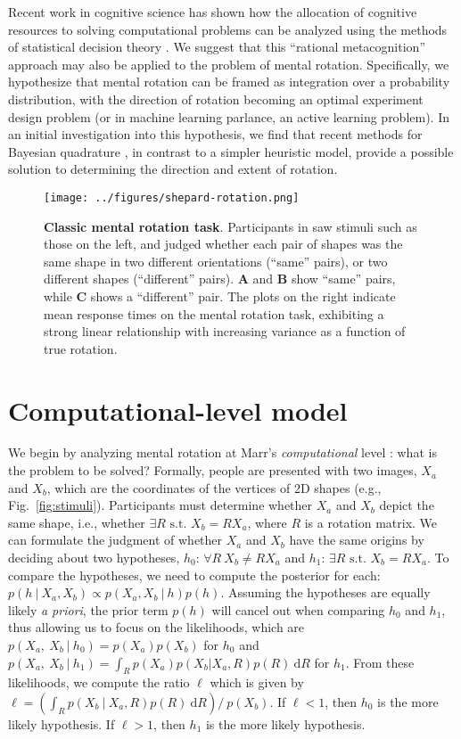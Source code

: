 \documentclass{article} %
\begin{document}
Recent work in cognitive science has shown how the allocation of
cognitive resources to solving computational problems can be analyzed
using the methods of statistical decision theory
\cite{Lieder:2012wg,Vul:2009wy}. We suggest that this ``rational
metacognition'' approach may also be applied to the problem of mental
rotation. Specifically, we hypothesize that mental rotation can be
framed as integration over a probability distribution, with the
direction of rotation becoming an optimal experiment design problem
(or in machine learning parlance, an active learning problem). In an
initial investigation into this hypothesis, we find that recent
methods for Bayesian quadrature
\cite{Diaconis:1988uo,OHagan:1991tx,Osborne:2012tm}, in contrast to a
simpler heuristic model, provide a possible solution to determining
the direction and extent of rotation.

\begin{figure}[t]
  \centering
  \texttt{[image: ../figures/shepard-rotation.png]}
  \caption{\textbf{Classic mental rotation task}. Participants in
    \cite{Shepard1971} saw stimuli such as those on the left, and
    judged whether each pair of shapes was the same shape in two
    different orientations (``same'' pairs), or two different shapes
    (``different'' pairs). \textbf{A} and \textbf{B} show ``same''
    pairs, while \textbf{C} shows a ``different'' pair. The plots on
    the right indicate mean response times on the mental rotation
    task, exhibiting a strong linear relationship with increasing
    variance as a function of true rotation.}
  \label{fig:mental-rotation}
\end{figure}

\section{Computational-level model}

We begin by analyzing mental rotation at Marr's \textit{computational}
level \cite{Marr:1983to}: what is the problem to be solved?  Formally,
people are presented with two images, $X_a$ and $X_b$, which are the
coordinates of the vertices of 2D shapes (e.g.,
Fig.~\ref{fig:stimuli}). Participants must determine whether $X_a$ and
$X_b$ depict the same shape, i.e., whether $\exists R\textrm{ s.t. }
X_b=RX_a$, where $R$ is a rotation matrix. We can formulate the
judgment of whether $X_a$ and $X_b$ have the same origins by deciding
about two hypotheses, $h_0$: $\forall R\ X_b\neq RX_a$ and $h_1$:
$\exists R\textrm{ s.t. } X_b=RX_a$.  To compare the hypotheses, we
need to compute the posterior for each: $p(h\ \vert\ X_a, X_b)\propto
p(X_a, X_b\ \vert\ h)p(h)$. Assuming the hypotheses are equally likely
\textit{a priori}, the prior term $p(h)$ will cancel out when
comparing $h_0$ and $h_1$, thus allowing us to focus on the
likelihoods, which are $p(X_a,\ X_b\ \vert \ h_0)=p(X_a)p(X_b)$ for
$h_0$ and $p(X_a,\ X_b\ \vert \ h_1)=\int_R p(X_a) p(X_b\vert X_a,R)
p(R)\ \mathrm{d}R$ for $h_1$. From these likelihoods, we compute the
ratio $\ell$ which is given by $\ell=\left(\int_R p(X_b\ \vert\ X_a,
  R)p(R)\ \mathrm{d}R\right) /\ p(X_b)$. If $\ell<1$, then $h_0$ is
the more likely hypothesis. If $\ell>1$, then $h_1$ is the more likely
hypothesis.
\end{document}
